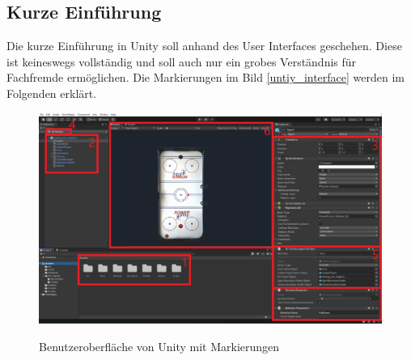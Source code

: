 \subsection{Kurze Einführung}
\label{subsect:Kurze Einführung}

Die kurze Einführung in Unity soll anhand des User Interfaces geschehen. Diese ist keineswegs vollständig und soll auch nur ein grobes Verständnis für Fachfremde ermöglichen. Die Markierungen im Bild \ref{untiy_interface} werden im Folgenden erklärt.

\begin{figure}
\includegraphics[scale=0.3]{images/unity_interface_marked}
\label{unity_interface_pic}
\caption{Benutzeroberfläche von Unity mit Markierungen}
\end{figure}

